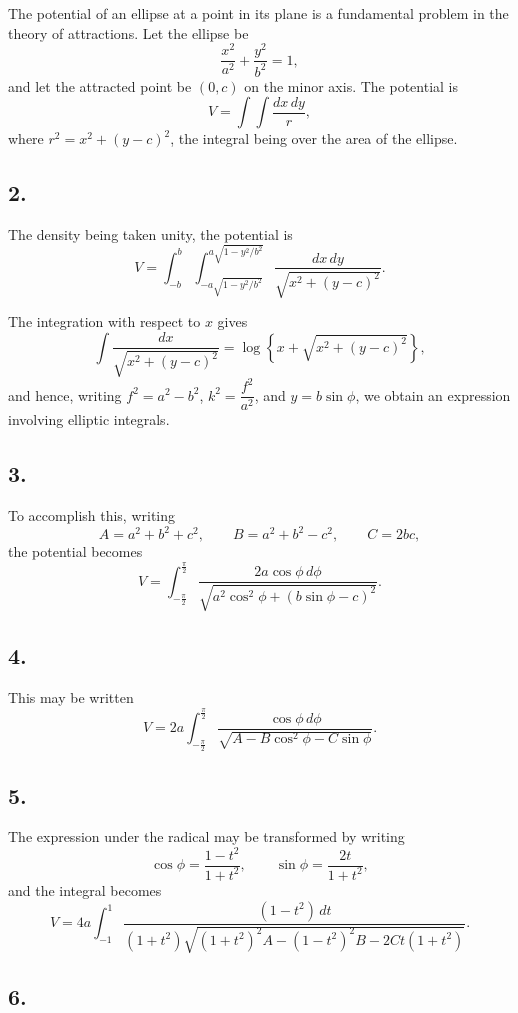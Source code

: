 \documentclass[11pt,a4paper]{book}
\begin{document}
The potential of an ellipse at a point in its plane is a fundamental problem
in the theory of attractions. Let the ellipse be
\[
\frac{x^2}{a^2} + \frac{y^2}{b^2} = 1,
\]
and let the attracted point be $(0,c)$ on the minor axis. The potential is
\[
V = \int\!\!\!\int \frac{dx\,dy}{r},
\]
where $r^2=x^2+(y-c)^2$, the integral being over the area of the ellipse.

\subsection*{2.}

The density being taken unity, the potential is
\[
V = \int_{-b}^{b} \int_{-a\sqrt{1-y^2/b^2}}^{a\sqrt{1-y^2/b^2}}
    \frac{dx\,dy}{\sqrt{x^2+(y-c)^2}}.
\]

The integration with respect to $x$ gives
\[
\int \frac{dx}{\sqrt{x^2+(y-c)^2}}
  = \log\left\{x+\sqrt{x^2+(y-c)^2}\right\},
\]
and hence, writing $f^2=a^2-b^2$, $k^2=\dfrac{f^2}{a^2}$, and
$y=b\sin\phi$, we obtain an expression involving elliptic integrals.

\newpage
\subsection*{3.}

To accomplish this, writing
\[
A = a^2+b^2+c^2, \qquad
B = a^2+b^2-c^2, \qquad
C = 2bc,
\]
the potential becomes
\[
V = \int_{-\frac{\pi}{2}}^{\frac{\pi}{2}}
    \frac{2a\cos\phi\,d\phi}
         {\sqrt{a^2\cos^2\phi+(b\sin\phi-c)^2}}.
\]

\subsection*{4.}

This may be written
\[
V = 2a \int_{-\frac{\pi}{2}}^{\frac{\pi}{2}}
    \frac{\cos\phi\,d\phi}
         {\sqrt{A-B\cos^2\phi-C\sin\phi}}.
\]

\subsection*{5.}

The expression under the radical may be transformed by writing
\[
\cos\phi = \frac{1-t^2}{1+t^2}, \qquad
\sin\phi = \frac{2t}{1+t^2},
\]
and the integral becomes
\[
V = 4a \int_{-1}^{1}
    \frac{(1-t^2)\,dt}
         {(1+t^2)\sqrt{(1+t^2)^2A-(1-t^2)^2B-2Ct(1+t^2)}}.
\]

\subsection*{6.}
\end{document}
